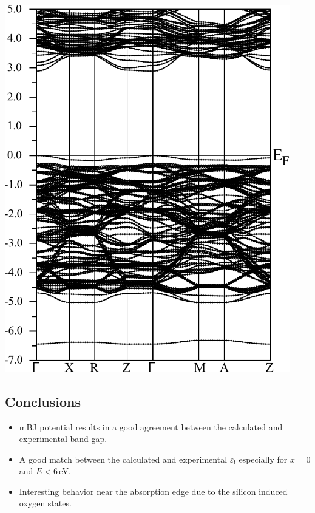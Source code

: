 \documentclass[blues]{poster}
\let\eps=\varepsilon
\begin{document}
\begin{multicols}{2}
\begin{minipage}{0.5\linewidth}
\begin{center}
\includegraphics[height=16cm]{figures/spaghettinotOSi.pdf}
\end{center}
\end{minipage}

\renewcommand{\familydefault}{\rmdefault}
\normalfont

\vspace{-0.5cm}
\subsection{Conclusions}
\begin{itemize}
\item{mBJ potential results in a good agreement between the calculated and experimental band gap.}
\item{A good match between the calculated and experimental $\eps_\mathrm{i}$ especially for $x = 0$ and $E < 6$\,eV.}
\item{Interesting behavior near the absorption edge due to the silicon induced oxygen states.}
\end{itemize}

\vspace{-0.5cm}

\end{multicols}
\end{document}
